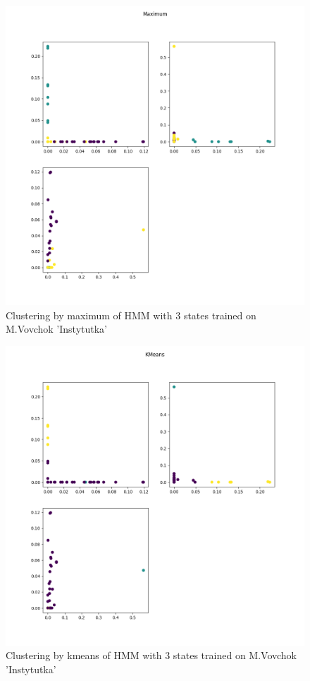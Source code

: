 \documentclass[12pt,a4paper]{article}
\begin{document}
  \begin{figure}[h]
    \includegraphics[width=\textwidth]{../plots/marko-instutytka-clustering-3-max-1670780571.6524851.png}
    \centering
    \caption{Clustering by maximum of HMM with 3 states trained on M.Vovchok 'Instytutka'}
  \end{figure}

  \begin{figure}[h]
    \includegraphics[width=\textwidth]{../plots/marko-instutytka-clustering-3-kmeans-1670780571.8452613.png}
    \centering
    \caption{Clustering by kmeans of HMM with 3 states trained on M.Vovchok 'Instytutka'}
  \end{figure}
	
\end{document}
